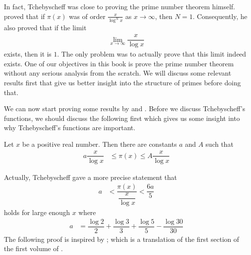 \documentclass[elemannt.tex]{subfile}
\begin{document}
	In fact, Tchebyscheff was close to proving the prime number theorem himself. \textcite{tschebischeff_1852} proved that if $\pi(x)$ was of order $\frac{x}{\log^{N}{x}}$ as $x\to\infty$, then $N=1$. Consequently, he also proved that if the limit
		\begin{align*}
			\lim_{x\to\infty}\dfrac{x}{\log{x}}
		\end{align*}
	exists, then it is $1$. The only problem was to actually prove that this limit indeed exists. One of our objectives in this book is prove the prime number theorem without any serious analysis from the scratch. We will discuss some relevant results first that give us better insight into the structure of primes before doing that.
		
	We can now start proving some results by \textcite{tchebycheff_1852} and \textcite{tschebischeff_1852}. Before we discuss Tchebyscheff's functions, we should discuss the following first which gives us some insight into why Tchebyscheff's functions are important.
		\begin{theorem}[Tchebyscheff]\label{thm:tchebycheffbound}
			Let $x$ be a positive real number. Then there are constants $a$ and $A$ such that
				\begin{align*}
					a\dfrac{x}{\log{x}}
						& \leq \pi(x) \leq A\dfrac{x}{\log{x}}
				\end{align*}
		\end{theorem}
	Actually, Tchebyscheff gave a more precise statement that
		\begin{align*}
			a
				& < \dfrac{\pi(x)}{\dfrac{x}{\log{x}}} < \dfrac{6a}{5}
		\end{align*}
	holds for large enough $x$ where
		\begin{align*}
			a
				& = \dfrac{\log{2}}{2}+\dfrac{\log{3}}{3}+\dfrac{\log{5}}{5}-\dfrac{\log{30}}{30}
		\end{align*}
	The following proof is inspired by \textcite[Theorem 112]{landau_1969}; which is a translation of the first section of the first volume of \textcite{landau_1927}.
\end{document}
